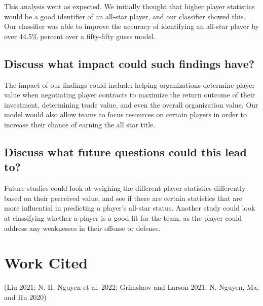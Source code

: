 \documentclass[
]{article}
\begin{document}
This analysis went as expected. We initially thought that higher player statistics would be a good identifier of an all-star player, and our classifier showed this. Our classifier was able to improve the accuracy of identifying an all-star player by over 44.5\% percent over a fifty-fifty guess model.

\hypertarget{discuss-what-impact-could-such-findings-have}{%
\subsection{Discuss what impact could such findings have?}\label{discuss-what-impact-could-such-findings-have}}

The impact of our findings could include: helping organizations determine player value when negotiating player contracts to maximize the return outcome of their investment, determining trade value, and even the overall organization value. Our model would also allow teams to focus resources on certain players in order to increase their chance of earning the all star title.

\hypertarget{discuss-what-future-questions-could-this-lead-to}{%
\subsection{Discuss what future questions could this lead to?}\label{discuss-what-future-questions-could-this-lead-to}}

Future studies could look at weighing the different player statistics differently based on their perceived value, and see if there are certain statistics that are more influential in predicting a player's all-star status. Another study could look at classifying whether a player is a good fit for the team, as the player could address any weaknesses in their offense or defense.

\hypertarget{work-cited}{%
\section{Work Cited}\label{work-cited}}

(Liu 2021; N. H. Nguyen et al. 2022; Grimshaw and Larson 2021; N. Nguyen, Ma, and Hu 2020)
\end{document}
